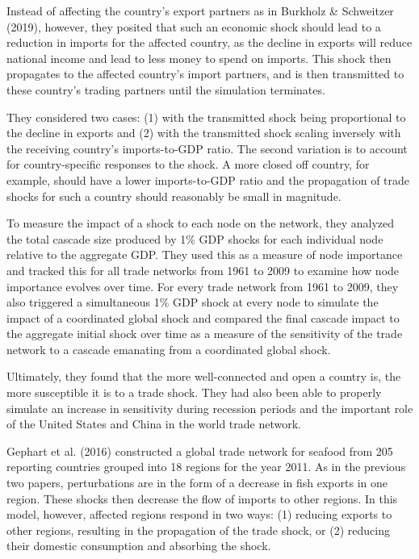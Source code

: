 \documentclass[12pt,letterpaper]{report}
\begin{document}
	Instead of affecting the country's export partners as in Burkholz \& Schweitzer (2019), however, they posited that such an economic shock should lead to a reduction in imports for the affected country, as the decline in exports will reduce national income and lead to less money to spend on imports. This shock then propagates to the affected country's import partners, and is then transmitted to these country's trading partners until the simulation terminates.
	
	They considered two cases: (1) with the transmitted shock being proportional to the decline in exports and (2) with the transmitted shock scaling inversely with the receiving country's imports-to-GDP ratio. The second variation is to account for country-specific responses to the shock. A more closed off country, for example, should have a lower imports-to-GDP ratio and the propagation of trade shocks for such a country should reasonably be small in magnitude. 
	
	To measure the impact of a shock to each node on the network, they analyzed the total cascade size produced by 1\% GDP shocks for each individual node relative to the aggregate GDP. They used this as a measure of node importance and tracked this for all trade networks from 1961 to 2009 to examine how node importance evolves over time. For every trade network from 1961 to 2009, they also triggered a simultaneous 1\% GDP shock at every node to simulate the impact of a coordinated global shock and compared the final cascade impact to the aggregate initial shock over time as a measure of the sensitivity of the trade network to a cascade emanating from a coordinated global shock.
	
	Ultimately, they found that the more well-connected and open a country is, the more susceptible it is to a trade shock. They had also been able to properly simulate an increase in sensitivity during recession periods and the important role of the United States and China in the world trade network.
	
	Gephart et al. (2016) constructed a global trade network for seafood from 205 reporting countries grouped into 18 regions for the year 2011. As in the previous two papers, perturbations are in the form of a decrease in fish exports in one region. These shocks then decrease the flow of imports to other regions. In this model, however, affected regions respond in two ways: (1) reducing exports to other regions, resulting in the propagation of the trade shock, or (2) reducing their domestic consumption and absorbing the shock. 
	
\end{document}
